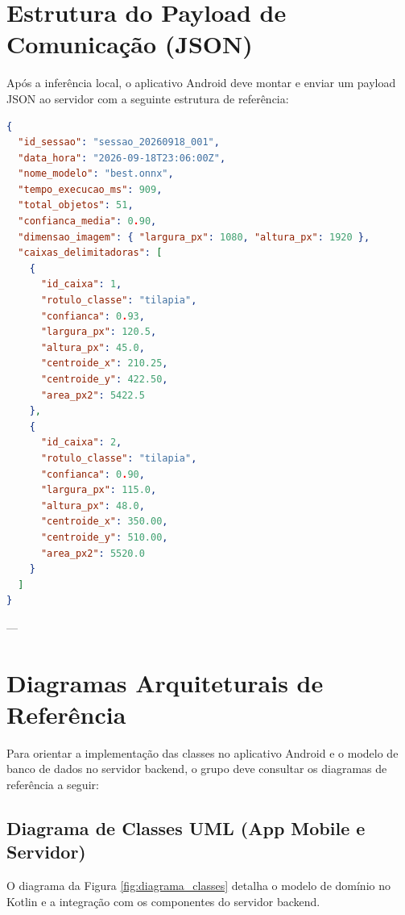 \documentclass[12pt]{article}
\begin{document}
\newpage
\section{Estrutura do Payload de Comunicação (JSON)}

Após a inferência local, o aplicativo Android deve montar e enviar um payload JSON ao servidor com a seguinte estrutura de referência:

\begin{lstlisting}[language=json]
{
  "id_sessao": "sessao_20260918_001",
  "data_hora": "2026-09-18T23:06:00Z",
  "nome_modelo": "best.onnx",
  "tempo_execucao_ms": 909,
  "total_objetos": 51,
  "confianca_media": 0.90,
  "dimensao_imagem": { "largura_px": 1080, "altura_px": 1920 },
  "caixas_delimitadoras": [
    {
      "id_caixa": 1,
      "rotulo_classe": "tilapia",
      "confianca": 0.93,
      "largura_px": 120.5,
      "altura_px": 45.0,
      "centroide_x": 210.25,
      "centroide_y": 422.50,
      "area_px2": 5422.5
    },
    {
      "id_caixa": 2,
      "rotulo_classe": "tilapia",
      "confianca": 0.90,
      "largura_px": 115.0,
      "altura_px": 48.0,
      "centroide_x": 350.00,
      "centroide_y": 510.00,
      "area_px2": 5520.0
    }
  ]
}
\end{lstlisting}

---

\section{Diagramas Arquiteturais de Referência}

Para orientar a implementação das classes no aplicativo Android e o modelo de banco de dados no servidor backend, o grupo deve consultar os diagramas de referência a seguir:

\subsection{Diagrama de Classes UML (App Mobile e Servidor)}
O diagrama da Figura \ref{fig:diagrama_classes} detalha o modelo de domínio no Kotlin e a integração com os componentes do servidor backend.
\end{document}
